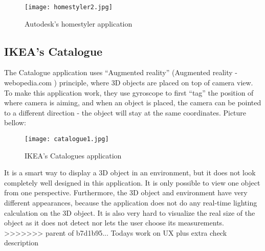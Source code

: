 \begin{figure}[H]
\centering
\texttt{[image: homestyler2.jpg]}
\caption{Autodesk's homestyler application}
\end{figure}

\subsection{IKEA’s Catalogue}

The Catalogue application uses “Augmented reality” (Augmented reality - webopedia.com ) principle, where 3D objects are placed on top of camera view. To make this application work, they use gyroscope to first “tag” the position of where camera is aiming, and when an object is placed, the camera can be pointed to a different direction - the object will stay at the same coordinates. Picture bellow:

\begin{figure}[H]
\centering
\texttt{[image: catalogue1.jpg]}
\caption{IKEA's Catalogues application}
\end{figure}

It is a smart way to display a 3D object in an environment, but it does not look completely well designed in this application. It is only possible to view one object from one perspective. Furthermore, the 3D object and environment have very different appearances, because the application does not do any real-time lighting calculation on the 3D object. It is also very hard to visualize the real size of the object as it does not detect nor lets the user choose its measurements.
>>>>>>> parent of b7d1b95... Todays work on UX plus extra check description
